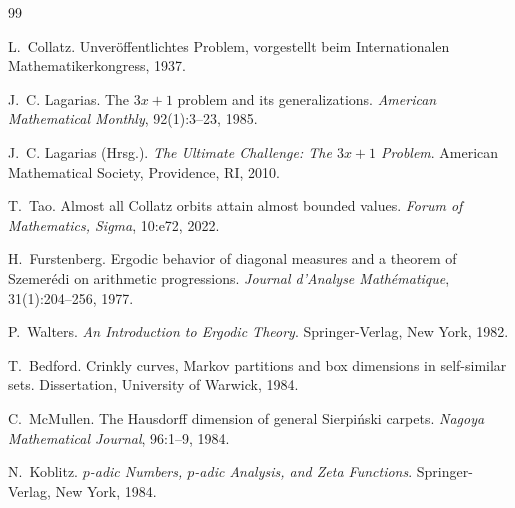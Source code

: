 \documentclass[12pt,a4paper]{article}
\begin{document}
\begin{thebibliography}{99}

L.~Collatz.
\newblock Unveröffentlichtes Problem, vorgestellt beim Internationalen Mathematikerkongress, 1937.

J.~C. Lagarias.
\newblock The $3x+1$ problem and its generalizations.
\newblock \emph{American Mathematical Monthly}, 92(1):3--23, 1985.

J.~C. Lagarias (Hrsg.).
\newblock \emph{The Ultimate Challenge: The $3x+1$ Problem}.
\newblock American Mathematical Society, Providence, RI, 2010.

T.~Tao.
\newblock Almost all Collatz orbits attain almost bounded values.
\newblock \emph{Forum of Mathematics, Sigma}, 10:e72, 2022.

H.~Furstenberg.
\newblock Ergodic behavior of diagonal measures and a theorem of Szemer\'edi on arithmetic progressions.
\newblock \emph{Journal d'Analyse Math\'ematique}, 31(1):204--256, 1977.

P.~Walters.
\newblock \emph{An Introduction to Ergodic Theory}.
\newblock Springer-Verlag, New York, 1982.

T.~Bedford.
\newblock Crinkly curves, Markov partitions and box dimensions in self-similar sets.
\newblock Dissertation, University of Warwick, 1984.

C.~McMullen.
\newblock The Hausdorff dimension of general Sierpi\'nski carpets.
\newblock \emph{Nagoya Mathematical Journal}, 96:1--9, 1984.

N.~Koblitz.
\newblock \emph{$p$-adic Numbers, $p$-adic Analysis, and Zeta Functions}.
\newblock Springer-Verlag, New York, 1984.

\end{thebibliography}
\end{document}
